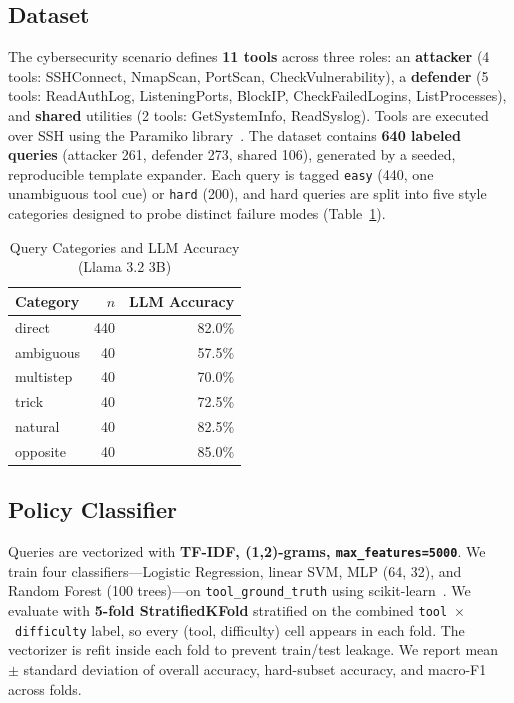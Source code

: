 \documentclass[conference]{IEEEtran}
\begin{document}
\subsection{Dataset}

The cybersecurity scenario defines \textbf{11 tools} across three roles: an
\textbf{attacker} (4 tools: SSHConnect, NmapScan, PortScan, CheckVulnerability),
a \textbf{defender} (5 tools: ReadAuthLog, ListeningPorts, BlockIP,
CheckFailedLogins, ListProcesses), and \textbf{shared} utilities (2 tools:
GetSystemInfo, ReadSyslog). Tools are executed over SSH using the Paramiko
library~\cite{paramiko}. The dataset contains \textbf{640 labeled queries}
(attacker 261, defender 273, shared 106), generated by a seeded, reproducible
template expander. Each query is tagged \texttt{easy} (440, one unambiguous tool
cue) or \texttt{hard} (200), and hard queries are split into five style
categories designed to probe distinct failure modes (Table~\ref{tab:categories}).

\begin{table}[htbp]
\caption{Query Categories and LLM Accuracy (Llama 3.2 3B)}
\label{tab:categories}
\centering
\begin{tabular}{lrr}
\toprule
Category & $n$ & LLM Accuracy \\
\midrule
direct     & 440 & 82.0\% \\
ambiguous  & 40  & 57.5\% \\
multistep  & 40  & 70.0\% \\
trick      & 40  & 72.5\% \\
natural    & 40  & 82.5\% \\
opposite   & 40  & 85.0\% \\
\bottomrule
\end{tabular}
\end{table}

\subsection{Policy Classifier}

Queries are vectorized with \textbf{TF-IDF, (1,2)-grams,
\texttt{max\_features=5000}}. We train four classifiers---Logistic Regression,
linear SVM, MLP (64, 32), and Random Forest (100 trees)---on
\texttt{tool\_ground\_truth} using scikit-learn~\cite{sklearn}. We evaluate with
\textbf{5-fold StratifiedKFold} stratified on the combined
\texttt{tool}~$\times$~\texttt{difficulty} label, so every (tool, difficulty)
cell appears in each fold. The vectorizer is refit inside each fold to prevent
train/test leakage. We report mean $\pm$ standard deviation of overall accuracy,
hard-subset accuracy, and macro-F1 across folds.
\end{document}

